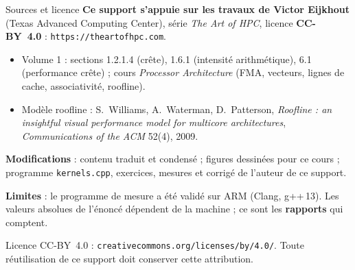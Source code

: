 \documentclass[8pt,aspectratio=169]{beamer}
\begin{document}
\begin{frame}{Sources et licence}
\textbf{Ce support s'appuie sur les travaux de Victor Eijkhout} (Texas Advanced Computing Center), série \emph{The Art of HPC}, licence \textbf{CC-BY~4.0} : \texttt{https://theartofhpc.com}.

\begin{itemize}
\item Volume 1 : sections 1.2.1.4 (crête), 1.6.1 (intensité arithmétique), 6.1 (performance crête) ; cours \emph{Processor Architecture} (FMA, vecteurs, lignes de cache, associativité, roofline).
\item Modèle roofline : S.~Williams, A.~Waterman, D.~Patterson, \emph{Roofline : an insightful visual performance model for multicore architectures}, \emph{Communications of the ACM} 52(4), 2009.
\end{itemize}

\medskip
\textbf{Modifications} : contenu traduit et condensé ; figures dessinées pour ce cours ; programme \texttt{kernels.cpp}, exercices, mesures et corrigé de l'auteur de ce support.

\medskip
\textbf{Limites} : le programme de mesure a été validé sur ARM (Clang, g++\,13). Les valeurs absolues de l'énoncé dépendent de la machine ; ce sont les \textbf{rapports} qui comptent.

\bigskip
{\scriptsize Licence CC-BY~4.0 : \texttt{creativecommons.org/licenses/by/4.0/}. Toute réutilisation de ce support doit conserver cette attribution.}
\end{frame}
\end{document}
